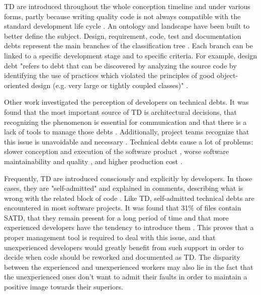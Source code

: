 \ac{TD} are introduced throughout the whole conception timeline and under various forms, partly because writing quality code is not always compatible with the standard development life cycle \citep{brown2010managing}. An ontology and landscape have been built to better define the subject. Design, requirement, code, test and documentation debts represent the main branches of the classification tree \citep{alves2014towards,izurieta2012organizing}. Each branch can be linked to a specific development stage and to specific criteria. For example, design debt "refers to debt that can be discovered by analyzing the source code by identifying the use of practices which violated the principles of good object-oriented design (e.g. very large or tightly coupled classes)" \citep{alves2014towards}. \par

Other work investigated the perception of developers on technical debts. It was found that the most important source of \ac{TD} is architectural decisions, that recognizing the phenomenon is essential for communication and that there is a lack of tools to manage those debts \citep{Ernst:2015:MMI:2786805.2786848}. Additionally, project teams recognize that this issue is unavoidable and necessary \citep{lim2012balancing}. Technical debts cause a lot of problems: slower conception and execution of the software product \citep{allman2012managing}, worse software maintainability and quality \citep{wehaibi2016examining,zazworka2011investigating}, and higher production cost \citep{guo2011tracking}. \par

Frequently, \ac{TD} are introduced consciously and explicitly by developers. In those cases, they are "self-admitted" and explained in comments, describing what is wrong with the related block of code \citep{PotdarS14}. Like \ac{TD}, self-admitted technical debts are encountered in most software projects. It was found that 31\% of files contain \ac{SATD}, that they remain present for a long period of time and that more experienced developers have the tendency to introduce them \citep{PotdarS14}. This proves that a proper management tool is required to deal with this issue, and that unexperienced developers would greatly benefit from such support in order to decide when code should be reworked and documented as \ac{TD}. The disparity between the experienced and unexperienced workers may also lie in the fact that the unexperienced ones don't want to admit their faults in order to maintain a positive image towards their superiors. \par

